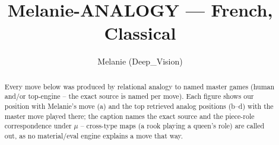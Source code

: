 \documentclass[11pt]{article}
\title{Melanie-ANALOGY — French, Classical}
\author{Melanie (Deep\_Vision)}
\date{}
\begin{document}
\maketitle

\begin{abstract}Every move below was produced by relational analogy to named master games (human and/or top-engine -- the exact source is named per move). Each figure shows our position with Melanie's move (a) and the top retrieved analog positions (b--d) with the master move played there; the caption names the exact source and the piece-role correspondence under $\mu$ -- cross-type maps (a rook playing a queen's role) are called out, as no material/eval engine explains a move that way.\end{abstract}

\begin{figure}[p]\centering
\begin{subfigure}{0.46\textwidth}\centering
\resizebox{\linewidth}{!}{%
\newchessgame
\chessboard[
  setfen={rnb1k2r/pppnqppp/4p3/3pP3/3P4/2N5/PPP2PPP/R2QKBNR w KQkq - 0 7},
  showmover=false,
  pgfstyle=straightmove, color=movearrow, markmove={f2-f4}
]}
\caption{}
\end{subfigure}\hfill
\begin{subfigure}{0.46\textwidth}\centering
\resizebox{\linewidth}{!}{%
\newchessgame
\chessboard[
  setfen={rnb1k2r/pppnqppp/4p3/3pP3/3P4/2N5/PPP2PPP/R2QKBNR w KQkq - 0 7},
  showmover=false,
  pgfstyle=straightmove, color=movearrow, markmove={f2-f4}
]}
\caption{}
\end{subfigure}
\\[4pt]
\begin{subfigure}{0.46\textwidth}\centering
\resizebox{\linewidth}{!}{%
\newchessgame
\chessboard[
  setfen={rnb1k2r/pppnqppp/4p3/3pP3/3P4/2N5/PPP2PPP/R2QKBNR w KQkq - 0 7},
  showmover=false,
  pgfstyle=straightmove, color=movearrow, markmove={f2-f4}
]}
\caption{}
\end{subfigure}\hfill
\begin{subfigure}{0.46\textwidth}\centering
\resizebox{\linewidth}{!}{%
\newchessgame
\chessboard[
  setfen={rnb1k2r/pppnqppp/4p3/3pP3/3P4/2N5/PPP2PPP/R2QKBNR w KQkq - 0 7},
  showmover=false,
  pgfstyle=straightmove, color=movearrow, markmove={f2-f4}
]}
\caption{}
\end{subfigure}

\end{figure}
\end{document}
